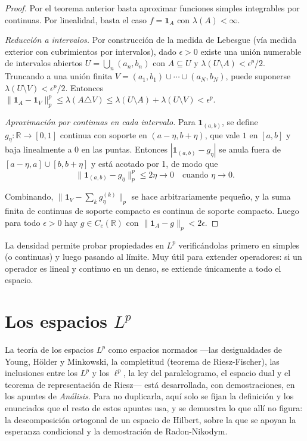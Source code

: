 \documentclass[11pt, a4paper]{article}
\begin{document}
\begin{proof}
Por el teorema anterior basta aproximar funciones simples integrables por continuas. Por
linealidad, basta el caso $f = \mathbf{1}_A$ con $\lambda(A) < \infty$.

\textit{Reducción a intervalos.} Por construcción de la medida de Lebesgue (vía medida
exterior con cubrimientos por intervalos), dado $\epsilon > 0$ existe una unión numerable de
intervalos abiertos $U = \bigcup_n (a_n, b_n)$ con $A \subseteq U$ y $\lambda(U \setminus A) <
\epsilon^p / 2$. Truncando a una unión finita $V = (a_1, b_1) \cup \cdots \cup (a_N, b_N)$,
puede suponerse $\lambda(U \setminus V) < \epsilon^p / 2$. Entonces $\|\mathbf{1}_A -
\mathbf{1}_V\|_p^p \le \lambda(A \triangle V) \le \lambda(U \setminus A) + \lambda(U \setminus V) <
\epsilon^p$.

\textit{Aproximación por continuas en cada intervalo.} Para $\mathbf{1}_{(a, b)}$, se define
$g_\eta: \mathbb{R} \to [0, 1]$ continua con soporte en $(a - \eta, b + \eta)$, que vale $1$ en
$[a, b]$ y baja linealmente a $0$ en las puntas. Entonces $|\mathbf{1}_{(a, b)} - g_\eta|$ se
anula fuera de $[a - \eta, a] \cup [b, b + \eta]$ y está acotado por 1, de modo que
$$ \|\mathbf{1}_{(a, b)} - g_\eta\|_p^p \le 2 \eta \to 0 \quad \text{cuando } \eta \to 0. $$

Combinando, $\|\mathbf{1}_V - \sum_k g_\eta^{(k)}\|_p$ se hace arbitrariamente pequeño, y la suma
finita de continuas de soporte compacto es continua de soporte compacto. Luego para todo
$\epsilon > 0$ hay $g \in C_c(\mathbb{R})$ con $\|\mathbf{1}_A - g\|_p < 2 \epsilon$.
\end{proof}

\obs La densidad permite probar propiedades en $L^p$ verificándolas primero en simples (o
continuas) y luego pasando al límite. Muy útil para extender operadores: si un operador es
lineal y continuo en un denso, se extiende únicamente a todo el espacio.

\newpage

\section{Los espacios \texorpdfstring{$L^p$}{Lp}}

La teoría de los espacios $L^p$ como espacios normados —las desigualdades de Young, Hölder y
Minkowski, la completitud (teorema de Riesz-Fischer), las inclusiones entre los $L^p$ y los
$\ell^p$, la ley del paralelogramo, el espacio dual y el teorema de representación de Riesz—
está desarrollada, con demostraciones, en los apuntes de \emph{Análisis}. Para no duplicarla,
aquí solo se fijan la definición y los enunciados que el resto de estos apuntes usa, y se
demuestra lo que allí no figura: la descomposición ortogonal de un espacio de Hilbert, sobre
la que se apoyan la esperanza condicional y la demostración de Radon-Nikodym.
\end{document}
